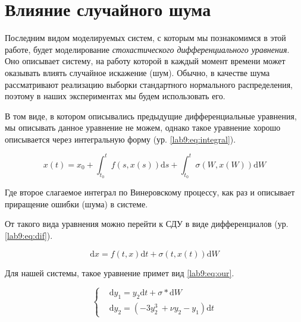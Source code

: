 \chapter{Влияние случайного шума}\label{lab9}
Последним видом моделируемых систем, с которым мы познакомимся
в этой работе, будет моделирование \textit{стохастического
дифференциального уравнения}. Оно описывает систему, на работу
которой в каждый момент времени может оказывать влиять
случайное искажение (шум). Обычно, в качестве шума рассматривают
реализацию выборки стандартного нормального распределения,
поэтому в наших экспериментах мы будем использовать его.

В том виде, в котором описывались предыдущие дифференциальные
уравнения, мы описывать данное уравнение не можем, однако
такое уравнение хорошо описывается через интегральную форму
(ур. \eqref{lab9:eq:integral}).

\begin{equation}\label{lab9:eq:integral}
    x(t) = x_0 + \int_{t_0}^t f(s,x(s))\mathrm{d}s +
                 \int_{t_0}^t \sigma(W, x(W))\mathrm{d}W
\end{equation}

Где второе слагаемое интеграл по Винеровскому процессу,
как раз и описывает приращение ошибки (шума) в системе.


От такого вида уравнения можно перейти к СДУ в виде
дифференциалов (ур. \eqref{lab9:eq:dif}).

\begin{equation}\label{lab9:eq:dif}
    \mathrm{d}x = f(t, x)\mathrm{d}t +
                  \sigma(t, x(t))\mathrm{d}W
\end{equation}

Для нашей системы, такое уравнение примет вид \eqref{lab9:eq:our}.

\begin{equation}\label{lab9:eq:our}
\begin{cases}
    &\mathrm{d}y_1 = y_2\mathrm{d}t + \sigma * \mathrm{d}W\\
    &\mathrm{d}y_2 = (-3y_2^3\ + \nu y_2 - y_1)\mathrm{d}t
\end{cases}
\end{equation}

